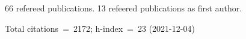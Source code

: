 66 refereed publications. 13 refeered publications as first author.

Total citations~=~2172; h-index~=~23 (2021-12-04)